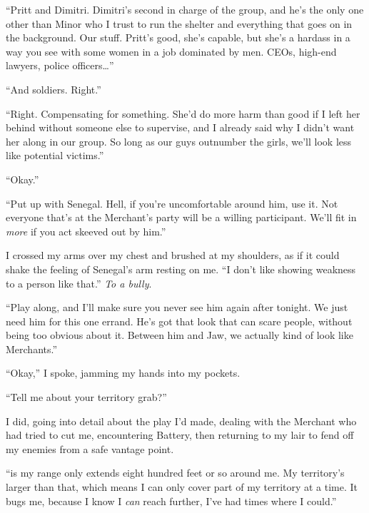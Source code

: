 ``Pritt and Dimitri.  Dimitri's second in charge of the group, and he's the only one other than Minor who I trust to run the shelter and everything that goes on in the background.  Our stuff.  Pritt's good, she's capable, but she's a hardass in a way you see with some women in a job dominated by men.  CEOs, high-end lawyers, police officers\ldots''



``And soldiers.  Right.''



``Right.  Compensating for something.  She'd do more harm than good if I left her behind without someone else to supervise, and I already said why I didn't want her along in our group.  So long as our guys outnumber the girls, we'll look less like potential victims.''



``Okay.''



``Put up with Senegal.  Hell, if you're uncomfortable around him, use it.  Not everyone that's at the Merchant's party will be a willing participant.  We'll fit in \emph{more} if you act skeeved out by him.''



I crossed my arms over my chest and brushed at my shoulders, as if it could shake the feeling of Senegal's arm resting on me.  ``I don't like showing weakness to a person like that.''  \emph{To a bully}.



``Play along, and I'll make sure you never see him again after tonight.  We just need him for this one errand.  He's got that look that can scare people, without being too obvious about it.  Between him and Jaw, we actually kind of look like Merchants.''



``Okay,'' I spoke, jamming my hands into my pockets.



``Tell me about your territory grab?''



I did, going into detail about the play I'd made, dealing with the Merchant who had tried to cut me, encountering Battery, then returning to my lair to fend off my enemies from a safe vantage point.



``\ldotsProblem is my range only extends eight hundred feet or so around me.  My territory's larger than that, which means I can only cover part of my territory at a time.  It bugs me, because I know I \emph{can} reach further, I've had times where I could.''



